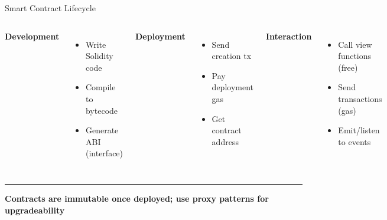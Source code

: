 \documentclass[8pt,aspectratio=169]{beamer}
\newcommand{\bottomnote}[1]{%
\vfill
\vspace{-2mm}
\textcolor{mllavender2}{\rule{\textwidth}{0.4pt}}
\vspace{1mm}
\footnotesize
\textbf{#1}
}
\begin{document}
\begin{frame}[t]{Smart Contract Lifecycle}
\begin{center}
\end{center}

\vspace{0.5em}
\begin{columns}[T]
\textbf{Development}
\begin{itemize}
\item Write Solidity code
\item Compile to bytecode
\item Generate ABI (interface)
\end{itemize}

\textbf{Deployment}
\begin{itemize}
\item Send creation tx
\item Pay deployment gas
\item Get contract address
\end{itemize}

\textbf{Interaction}
\begin{itemize}
\item Call view functions (free)
\item Send transactions (gas)
\item Emit/listen to events
\end{itemize}
\end{columns}

\bottomnote{Contracts are immutable once deployed; use proxy patterns for upgradeability}
\end{frame}
\end{document}
